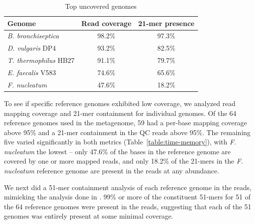 \documentclass[11pt]{article}
\begin{document}
\begin{table}[!h]
\centering
\caption{Top uncovered genomes}
\begin{tabular}{|l|c|c|}\hline
\textbf{Genome} & \textbf {Read coverage} & \textbf{21-mer presence} \\ \hline 

{{\em B. bronchiseptica}} & 98.2\% & 97.3\% \\
\hline
{{\em D. vulgaris} DP4}  & 93.2\% & 82.5\% \\
\hline
{{\em T. thermophilus} HB27}  & 91.1\% & 79.7\% \\
\hline
{{\em E. faecalis} V583}  & 74.6\% & 65.6\% \\
\hline
{{\em F. nucleatum}}  & 47.6\% & 18.2\% \\
\hline
\end{tabular}
\label{table:genomes_uncovered-analysis}
\end{table}

To see if specific reference genomes exhibited low coverage, we
analyzed read mapping coverage and 21-mer containment for individual
genomes.  Of the 64 reference genomes used in the metagenome, 59 had a
per-base mapping coverage above 95\% and a 21-mer containment in the
QC reads above 95\%.  The remaining five varied significantly in both
metrics (Table~\ref{table:time-memory}), with {\em F. nucleatum} the
lowest -- only 47.6\% of the bases in the reference genome are
covered by one or more mapped reads, and only 18.2\% of the 21-mers in
the {\em F. nucleatum} reference genome are present in the reads at
any abundance.


We next did a 51-mer containment analysis of each reference genome in
the reads, mimicking the analysis done in \cite{metapalette}.  99\% or
more of the constituent 51-mers for 51 of the 64 reference genomes
were present in the reads, suggesting that each of the 51 genomes was
entirely present at some minimal coverage.
\end{document}
